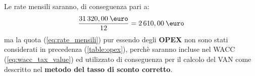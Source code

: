 Le rate mensili saranno, di conseguenza pari a:
 	\begin{equation}
	\label{eq:rate_mensili}
	\begin{split}
		\frac{31\thinspace 320,00 \: \mbox{\euro}}{12} = 2\thinspace 610,00 \: \mbox{\euro}
	\end{split}
	\end{equation}
ma la quota (\ref{eq:rate_mensili}) pur essendo degli \textbf{OPEX} non sono stati considerati in precedenza (\ref{table:opex}), perchè saranno incluse nel \ac{WACC} (\ref{eq:wacc_tax_value}) ed utilizzato di conseguenza per il calcolo del \ac{VAN} come descritto nel \textbf{metodo del tasso di sconto corretto}.	


